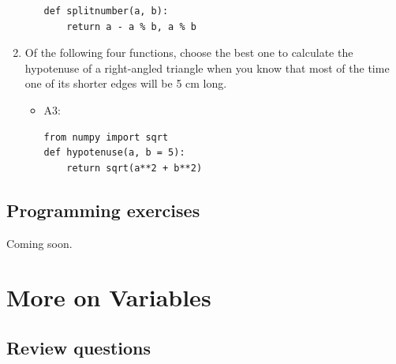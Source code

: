 \documentclass[article,A4,12pt]{llncs}
\begin{document}
\begin{enumerate}
\begin{itemize}
\begin{verbatim}
def splitnumber(a, b):
    return a - a % b, a % b
\end{verbatim}
  \end{itemize}
\item Of the following four functions, choose the best one to calculate the hypotenuse
      of a right-angled triangle when you know that most of the time one of its shorter
      edges will be 5 cm long.
  \begin{itemize}
    \item A3:
\begin{verbatim}
from numpy import sqrt
def hypotenuse(a, b = 5):
    return sqrt(a**2 + b**2)
\end{verbatim}
  \end{itemize}
\end{enumerate}


\subsection{Programming exercises}

Coming soon.


\section{More on Variables}

\subsection{Review questions}
\end{document}
